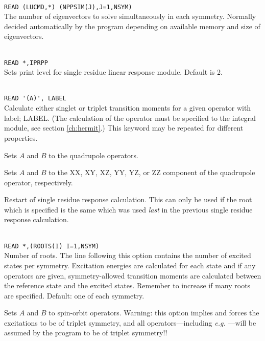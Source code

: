 \begin{description}
\item{}\\
\verb|READ (LUCMD,*) (NPPSIM(J),J=1,NSYM)|\\
The number of eigenvectors to solve simultaneously in each
symmetry. Normally decided automatically by the program depending on
available memory and size of eigenvectors.

\item{}\\
\verb|READ *,IPRPP|\\
Sets print level for single residue linear response module. Default is 2.

\item{}\\
\verb|READ '(A)', LABEL|\\
Calculate either singlet or triplet transition moments for a given operator with label; LABEL.
(The calculation of the operator must be specified to the integral
module, see section \ref{ch:hermit}.)
This keyword may be repeated for different properties.

\item{}
Sets $A$ and $B$ to the quadrupole operators.

\item{}
Sets $A$ and $B$ to the XX, XY, XZ, YY, YZ, or ZZ component of the
quadrupole operator, respectively.

\item{}
Restart of single residue response
calculation. This can only be used if the root which is
specified is the same which was used \textit{last} in the previous
single residue response calculation.

\item{}\\
\verb|READ *,(ROOTS(I) I=1,NSYM)|\\
Number of roots.  The line following this option contains the number
of excited states per symmetry. Excitation
energies are calculated for each state and if
any operators are given,
symmetry-allowed transition moments are
calculated between the
reference state and the excited states.
Remember to increase  if many roots are specified.
Default: one of each symmetry.

\item{}
Sets $A$ and $B$ to spin-orbit operators.
Warning: this option implies  and
forces the excitations to be of triplet symmetry,
and all operators---including
{\it e.g.\/} ---will be assumed by the program to be of triplet symmetry!!


\end{description}
